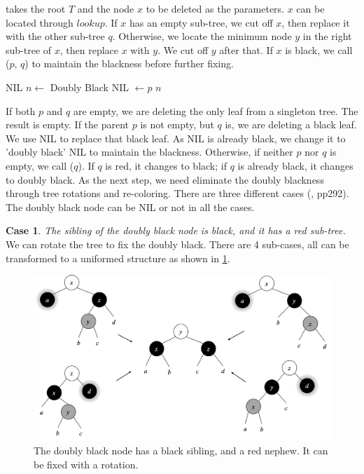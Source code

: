 \documentclass[b5paper]{article}
\begin{document}
 takes the root $T$ and the node $x$ to be deleted as the parameters. $x$ can be located through $lookup$. If $x$ has an empty sub-tree, we cut off $x$, then replace it with the other sub-tree $q$. Otherwise, we locate the minimum node $y$ in the right sub-tree of $x$, then replace $x$ with $y$. We cut off $y$ after that. If $x$ is black, we call ($p$, $q$) to maintain the blackness before further fixing.

\begin{algorithmic}[1]
    \State \Return NIL 
    \State $n \gets$ Doubly Black NIL
    \State {} $\gets p$
    \State \Return $n$
  \Else
    \State \Return {}
  \EndIf
\EndFunction
\end{algorithmic}

If both $p$ and $q$ are empty, we are deleting the only leaf from a singleton tree. The result is empty. If the parent $p$ is not empty, but $q$ is, we are deleting a black leaf. We use NIL to replace that black leaf. As NIL is already black, we change it to 'doubly black' NIL to maintain the blackness. Otherwise, if neither $p$ nor $q$ is empty, we call ($q$). If $q$ is red, it changes to black; if $q$ is already black, it changes to doubly black. As the next step, we need eliminate the doubly blackness through tree rotations and re-coloring. There are three different cases (\cite{CLRS}, pp292). The doubly black node can be NIL or not in all the cases.

\textbf{Case 1}. {\em The sibling of the doubly black node is black, and it has a red sub-tree.} We can rotate the tree to fix the doubly black. There are 4 sub-cases, all can be transformed to a uniformed structure as shown in \cref{fig:del-case1}.

\begin{figure}[htbp]
   \centering
   \includegraphics[scale=0.4]{../../../datastruct/tree/red-black-tree/img/del-case1}
   \caption{The doubly black node has a black sibling, and a red nephew. It can be fixed with a rotation.}
   \label{fig:del-case1}
\end{figure}
\end{document}
